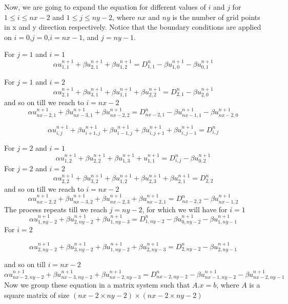 \newpage
Now, we are going to expand the equation for different values of $i$ and $j$ for $1\leq i \leq nx-2$ and $1\leq j \leq ny-2$, where $nx$ and $ny$ is the number of grid points in x and y direction respectively. Notice that the boundary conditions are applied on $i=0$,$j=0$,$i=nx-1$, and $j=ny-1$. 

For $j=1$ and $i=1$
$$
\alpha u_{1,1}^{n+1} + \beta u_{2,1}^{n+1} + \beta u_{1,2}^{n+1} = D_{1,1}^{n} - \beta u_{1,0}^{n+1} - \beta u_{0,1}^{n+1}
$$

For $j=1$ and $i=2$
$$
\alpha u_{2,1}^{n+1} + \beta u_{3,1}^{n+1} + \beta u_{1,1}^{n+1} + \beta u_{2,2}^{n+1} = D_{2,1}^{n} - \beta u_{2,0}^{n+1}
$$
and so on till we reach to $i=nx-2$
$$
\alpha u_{nx-2,1}^{n+1} + \beta u_{nx-3,1}^{n+1} + \beta u_{nx-2,2}^{n+1} = D_{nx-2,1}^{n} - \beta u_{nx-1,1}^{n+1} -\beta u_{nx-2,0}^{n+1} 
$$

$$
\alpha u_{i,j}^{n+1} + \beta u_{i+1,j}^{n+1} + \beta u_{i-1,j}^{n+1} + \beta u_{i,j+1}^{n+1} + \beta u_{i,j-1}^{n+1} = D_{i,j}^{n}
$$

For $j=2$ and $i=1$
$$
\alpha u_{1,2}^{n+1} + \beta u_{2,2}^{n+1} + \beta u_{1,3}^{n+1} + u_{1,1}^{n+1} = D_{i,j}^{n} - \beta u_{0,2}^{n+1}
$$
For $j=2$ and $i=2$
$$
\alpha u_{2,2}^{n+1} + \beta u_{3,2}^{n+1} + \beta u_{1,2}^{n+1} + \beta u_{2,3}^{n+1} + \beta u_{2,1}^{n+1} = D_{2,2}^{n}
$$
and so on till we reach to $i=nx-2$
$$
\alpha u_{nx-2,2}^{n+1} + \beta u_{nx-3,2}^{n+1} + \beta u_{nx-2,3}^{n+1} + \beta u_{nx-2,1}^{n+1} = D_{nx-2,2}^{n} - \beta u_{nx-1,2}^{n+1} 
$$
The process repeats till we reach $j=ny-2$, for which we will have for $i=1$
$$
\alpha u_{1,ny-2}^{n+1} + \beta u_{2,ny-2}^{n+1}  + \beta u_{1,ny-3}^{n+1} = D_{1,ny-2}^{n}- \beta u_{0,ny-2}^{n+1} - \beta u_{1,ny-1}^{n+1}
$$
For $i=2$

$$
\alpha u_{2,ny-2}^{n+1} + \beta u_{3,ny-2}^{n+1}+ \beta u_{1,ny-2}^{n+1} + \beta u_{2,ny-3}^{n+1} = D_{2,ny-2}^{n}-\beta u_{2,ny-1}^{n+1}
$$

and so on till $i=nx-2$
$$
\alpha u_{nx-2,ny-2}^{n+1} + \beta u_{nx-3,ny-2}^{n+1} + \beta u_{nx-2,ny-3}^{n+1} = D_{nx-2,ny-2}^{n}- \beta u_{nx-1,ny-2}^{n+1} - \beta u_{nx-2,ny-1}^{n+1}
$$
Now we group these equation in a matrix system such that $A.x=b$, where $A$ is a square matrix of size $(nx-2\times ny-2) \times (nx-2\times ny-2)$





